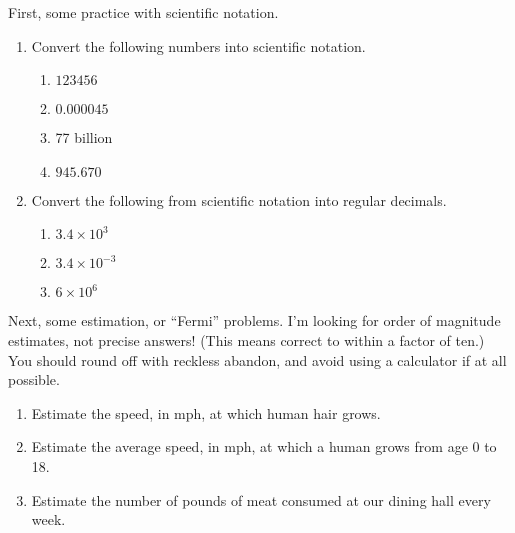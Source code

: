 \documentclass[12pt]{article}
\begin{document}
\noindent First, some practice with scientific notation.
\begin{enumerate}
  \setlength{\itemsep}{-1mm}
  \item Convert the following numbers into scientific notation.
  \begin{enumerate}
    \setlength{\itemsep}{-1mm}
    \item $123456$
    \item $0.000045$
    \item 77 billion
    \item $945.670$
\end{enumerate}
  \item Convert the following from scientific notation into regular
  decimals. 
  \begin{enumerate}
    \setlength{\itemsep}{-1mm}
    \item $3.4 \times 10^3$
    \item $3.4 \times 10^{-3}$
    \item $6 \times 10^6$\\
  \end{enumerate}

\end{enumerate}


\noindent Next, some estimation, or ``Fermi'' problems.  I'm looking
for order of magnitude estimates, not precise answers! (This means
correct to within a factor of ten.)  You should round off with
reckless abandon, and avoid using a calculator if at all possible.  
\begin{enumerate}
  \setlength{\itemsep}{-1mm}
     \item Estimate the speed, in mph, at which human hair grows.
     \item Estimate the average speed, in mph, at which a human grows
   from age 0 to 18. 
      \item Estimate the number of pounds of meat consumed at our
      dining hall every week. 
\end{enumerate}
\end{document}
